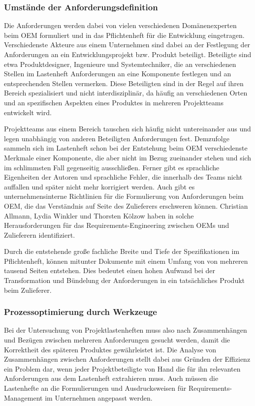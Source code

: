 \documentclass[12pt]{report}
\begin{document}
\subsubsection{Umstände der Anforderungsdefinition}
Die Anforderungen werden dabei von vielen verschiedenen Domänenexperten beim OEM formuliert und in das Pflichtenheft für die Entwicklung eingetragen. Verschiedenste Akteure aus einem Unternehmen sind dabei an der Festlegung der Anforderungen an ein Entwicklungsprojekt bzw. Produkt beteiligt. Beteiligte sind etwa Produktdesigner, Ingenieure und Systemtechniker, die an verschiedenen Stellen im Lastenheft Anforderungen an eine Komponente festlegen und an entsprechenden Stellen vermerken. Diese Beteiligten sind in der Regel auf ihren Bereich spezialisiert und nicht interdisziplinär, da häufig an verschiedenen Orten und an spezifischen Aspekten eines Produktes in mehreren Projektteams entwickelt wird. 

Projektteams aus einem Bereich tauschen sich häufig nicht untereinander aus und legen unabhängig von anderen Beteiligten Anforderungen fest. Demzufolge sammeln sich im Lastenheft schon bei der Entstehung beim OEM verschiedenste Merkmale einer Komponente, die aber nicht im Bezug zueinander stehen und sich im schlimmsten Fall gegenseitig ausschließen. Ferner gibt es sprachliche Eigenheiten der Autoren und sprachliche Fehler, die innerhalb des Teams nicht auffallen und später nicht mehr korrigiert werden. Auch gibt es unternehmensinterne Richtlinien für die Formulierung von Anforderungen beim OEM, die das Verständnis auf Seite des Zulieferers erschweren können. Christian Allmann, Lydia Winkler und Thorsten Kölzow haben in \cite{awk06} solche Herausforderungen für das Requirements-Engineering zwischen OEMs und Zulieferern identifiziert.

Durch die entstehende große fachliche Breite und Tiefe der Spezifikationen im Pflichtenheft, können mitunter Dokumente mit einem Umfang von von mehreren tausend Seiten entstehen. Dies bedeutet einen hohen Aufwand bei der Transformation und Bündelung der Anforderungen in ein tatsächliches Produkt beim Zulieferer. 

\subsubsection{Prozessoptimierung durch Werkzeuge}
Bei der Untersuchung von Projektlastenheften muss also nach Zusammenhängen und Bezügen zwischen mehreren Anforderungen gesucht werden, damit die Korrektheit des späteren Produktes gewährleistet ist. Die Analyse von Zusammenhängen zwischen Anforderungen stellt dabei aus Gründen der Effizienz ein Problem dar, wenn jeder Projektbeteiligte von Hand die für ihn relevanten Anforderungen aus dem Lastenheft extrahieren muss. Auch müssen die Lastenhefte an die Formulierungen und Ausdrucksweisen für Requirements-Management im Unternehmen angepasst werden. 
\end{document}
